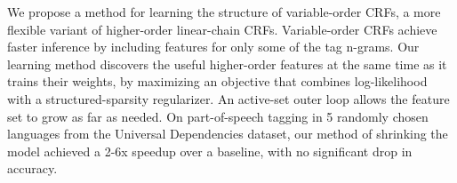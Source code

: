 We propose a method for learning the structure of variable-order CRFs, a more flexible variant of higher-order linear-chain CRFs. Variable-order CRFs achieve faster inference by including features for only some of the tag n-grams.  Our learning method discovers the useful higher-order features at the same time as it trains their weights, by maximizing an objective that combines log-likelihood with a structured-sparsity regularizer.                          An active-set outer loop allows the feature set to grow as far as needed.  On part-of-speech tagging in 5 randomly chosen languages from the Universal Dependencies dataset, our method of shrinking the model achieved a 2-6x speedup over a baseline, with no significant drop in accuracy.
